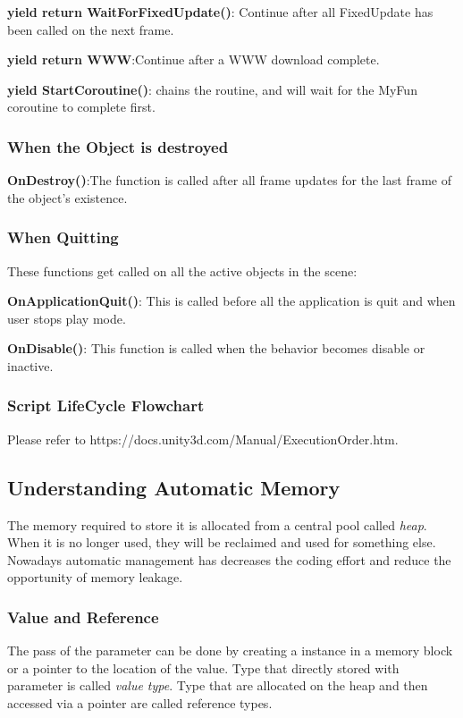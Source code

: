 \documentclass[10pt, a4paper]{article}
\begin{document}
                \textbf{yield return WaitForFixedUpdate()}: Continue after all FixedUpdate has been called on the next frame. 

                \textbf{yield return WWW}:Continue after a WWW download complete. 
                
                \textbf{yield StartCoroutine()}: chains the routine, and will wait for the MyFun coroutine to complete first. 
            \subsubsection{When the Object is destroyed}
                \textbf{OnDestroy()}:The function is called after all frame updates for the last frame of the object's existence. 
            \subsubsection{When Quitting}
                These functions get called on all the active objects in the scene:
                
                \textbf{OnApplicationQuit()}: This is called before all the application is quit and when user stops play mode. 

                \textbf{OnDisable()}: This function is called when the behavior becomes disable or inactive. 
            \subsubsection{Script LifeCycle Flowchart}
                Please refer to https://docs.unity3d.com/Manual/ExecutionOrder.htm. 
        \subsection{Understanding Automatic Memory}
            The memory required to store it is allocated from a central pool called \emph{heap}. When it is no longer used, they will be reclaimed and used for something else. Nowadays automatic management has decreases the coding effort and reduce the opportunity of memory leakage. 
            
            \subsubsection{Value and Reference}
                The pass of the parameter can be done by creating a instance in a memory block or a pointer to the location of the value. Type that directly stored with parameter is called \emph{value type}. Type that are allocated on the heap and then accessed via a pointer are called reference types.
\end{document}
